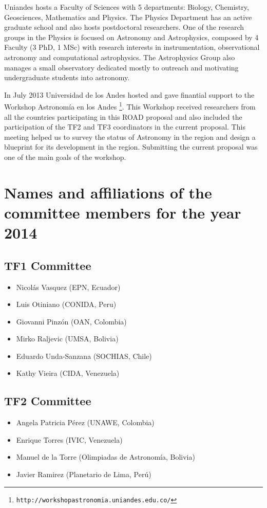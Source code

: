 \documentclass[12pt]{article}
\begin{document}
Uniandes hosts a Faculty of Sciences with 5 departments: Biology,
Chemistry, Geosciences, Mathematics and Physics. The Physics
Department has an active graduate school and also hosts postdoctoral
researchers. One of the research groups in the Physics is focused on
Astronomy and Astrophysics, composed by 4 Faculty (3 PhD, 1 MSc) with
research interests in instrumentation, observational astronomy and
computational astrophysics. The Astrophysics Group also manages a
small observatory dedicated mostly to outreach and motivating
undergraduate students into astronomy. 

In July 2013 Universidad de los Andes hosted and gave finantial
support to the Workshop Astronomía en los
Andes \footnote{\texttt{http://workshopastronomia.uniandes.edu.co/}}. This
Workshop received researchers from all the countries participating in
this ROAD proposal and also included the participation of the TF2 and
TF3 coordinators in the current proposal. This meeting helped us to
survey the status of Astronomy in the region and design a blueprint
for its development in the region. Submitting the current proposal was
one of the main goals of the workshop. 
 

\section{Names and affiliations of the committee members for the year 2014}

\subsection*{TF1 Committee}
\begin{itemize}
\item Nicol\'as Vasquez (EPN, Ecuador)
\item Luis Otiniano (CONIDA, Peru)
\item Giovanni Pinz\'on (OAN, Colombia)
\item Mirko Raljevic (UMSA, Bolivia)
\item Eduardo Unda-Sanzana (SOCHIAS, Chile)
\item Kathy Vieira (CIDA, Venezuela)
\end{itemize}

\subsection*{TF2 Committee}
\begin{itemize}
\item Angela Patricia Pérez (UNAWE, Colombia)
\item Enrique Torres  (IVIC, Venezuela)
\item Manuel de la Torre (Olimpiadas de Astronomía, Bolivia) 
\item Javier Ramirez (Planetario de Lima, Perú)
\end{itemize}
\end{document}
